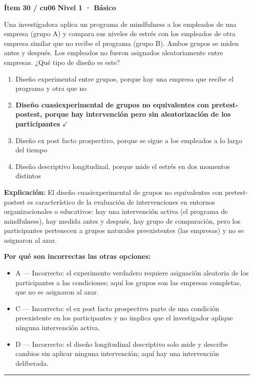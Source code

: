 \documentclass[12pt,a4paper]{article}
\begin{document}
\begin{mdframed}[backgroundcolor=fondogris,linecolor=azul,linewidth=1pt,innerleftmargin=10pt,innerrightmargin=10pt,innertopmargin=7pt,innerbottommargin=7pt]
\textbf{Ítem 30 / cu06} \hfill {\small\bfseries\color{azul} Nivel 1 · Básico}
\end{mdframed}

Una investigadora aplica un programa de mindfulness a los empleados de una empresa (grupo A) y compara sus niveles de estrés con los empleados de otra empresa similar que no recibe el programa (grupo B). Ambos grupos se miden antes y después. Los empleados no fueron asignados aleatoriamente entre empresas. ¿Qué tipo de diseño es este?

\begin{enumerate}
  \item[A.] Diseño experimental entre grupos, porque hay una empresa que recibe el programa y otra que no
  \item[\textbf{\color{verde}B.}] \textbf{\color{verde} Diseño cuasiexperimental de grupos no equivalentes con pretest-postest, porque hay intervención pero sin aleatorización de los participantes} \hfill $\checkmark$
  \item[C.] Diseño ex post facto prospectivo, porque se sigue a los empleados a lo largo del tiempo
  \item[D.] Diseño descriptivo longitudinal, porque mide el estrés en dos momentos distintos
\end{enumerate}

\noindent\textbf{\color{azul}Explicación:} El diseño cuasiexperimental de grupos no equivalentes con pretest-postest es característico de la evaluación de intervenciones en entornos organizacionales o educativos: hay una intervención activa (el programa de mindfulness), hay medida antes y después, hay grupo de comparación, pero los participantes pertenecen a grupos naturales preexistentes (las empresas) y no se asignaron al azar.

\noindent\textbf{\color{gris}Por qué son incorrectas las otras opciones:}
\begin{itemize}
  \item {\small A — Incorrecto: el experimento verdadero requiere asignación aleatoria de los participantes a las condiciones; aquí los grupos son las empresas completas, que no se asignaron al azar.}
  \item {\small C — Incorrecto: el ex post facto prospectivo parte de una condición preexistente en los participantes y no implica que el investigador aplique ninguna intervención activa.}
  \item {\small D — Incorrecto: el diseño longitudinal descriptivo solo mide y describe cambios sin aplicar ninguna intervención; aquí hay una intervención deliberada.}
\end{itemize}
\vspace{8pt}\hrule\vspace{10pt}
\end{document}
